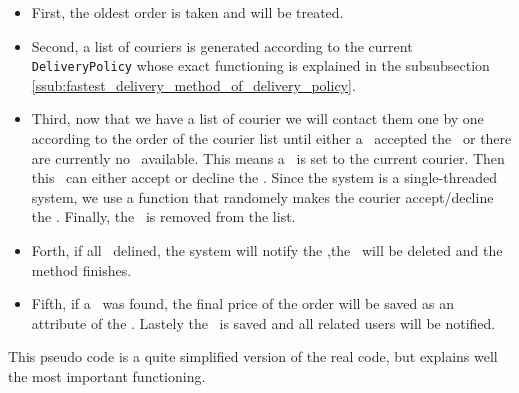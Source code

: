 \begin{itemize}
	\item First, the oldest order is taken and will be treated. 
	\item Second, a list of couriers is generated according to the current
		\lstinline|DeliveryPolicy| whose exact functioning is explained in the
		subsubsection \ref{ssub:fastest_delivery_method_of_delivery_policy}.
	\item Third, now that we have a list of courier we will contact them one by one
		according to the order of the courier list until either a \Courier~accepted
		the \Order~or there are currently no \Courier~available. This means a
		\Courier~is set to the current courier. Then this \Courier~can either accept
		or decline the \Order. Since the system is a single-threaded system, we use a
		function that randomely makes the courier accept/decline the \Order. Finally,
		the \Courier~is removed from the list.
	\item Forth, if all \Courier~delined, the system will notify the \Customer,the
		\Order~will be deleted and the method finishes.
	\item Fifth, if a \Courier~was found, the final price of the order will be saved
		as an attribute of the \Order. Lastely the \Order~is saved and all related
		users will be notified.	
\end{itemize}

This pseudo code is a quite simplified version of the real code, but explains well the
most important functioning.



